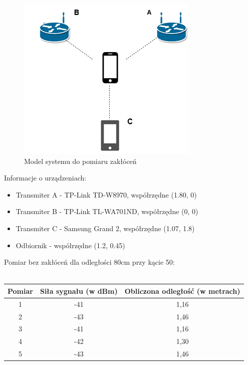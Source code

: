 \documentclass{article}
\begin{document}
		\begin{figure}				
			\centering
			\caption{Model systemu do pomiaru zakłóceń}
			\includegraphics{inz2}
		\end{figure}
		Informacje o urządzeniach:
		\begin{itemize}
			\item Transmiter A - TP-Link TD-W8970, współrzędne (1.80, 0)
			\item Transmiter B - TP-Link TL-WA701ND, współrzędne (0, 0)
			\item Transmiter C - Samsung Grand 2, współrzędne (1.07, 1.8)
			\item Odbiornik - współrzędne (1.2, 0.45)
		\end{itemize}
		\begin{center}
			\begin{minipage}{\linewidth}
				Pomiar bez zakłóceń dla odległości 80cm przy kącie 50\textdegree :\\\\
				\begin{tabular}{|c|c|c|}
					\hline 
					Pomiar & Siła sygnału (w dBm) & Obliczona odległość (w metrach) \\ 
					\hline 
					1 & -41 & 1,16 \\ 
					\hline 
					2 & -43 & 1,46 \\ 
					\hline 
					3 & -41 & 1,16 \\ 
					\hline 
					4 & -42 & 1,30 \\ 
					\hline 
					5 & -43 & 1,46 \\ 
					\hline 
				\end{tabular}
			\end{minipage} 
		\end{center}
\end{document}
